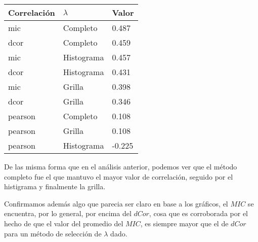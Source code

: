     \begin{table}[H]
        \centering
        \begin{tabular}{|l|l|l|}\hline
         Correlaci\'on    & $\lambda$ & Valor  \\    \hline
        mic     & Completo    & 0.487  \\
        dcor    & Completo    & 0.459  \\
        mic     & Histograma  & 0.457  \\
        dcor    & Histograma  & 0.431  \\
        mic     & Grilla      & 0.398  \\
        dcor    & Grilla      & 0.346 \\
        pearson & Completo    & 0.108  \\
        pearson & Grilla      & 0.108  \\
        pearson & Histograma  & -0.225 \\\hline
        \end{tabular}
    \end{table}
    
    De las misma forma que en el an\'alisis anterior, podemos ver que el m\'etodo completo fue el que mantuvo el mayor valor de correlaci\'on, seguido por el histigrama y finalmente la grilla. 
    
    Confirmamos adem\'as algo que parecia ser claro en base a los gr\'aficos, el $MIC$ se encuentra, por lo general, por encima del $dCor$, cosa que es corroborada por el hecho de que el valor del promedio del $MIC$, es siempre mayor que el de $dCor$ para un m\'etodo de selecci\'on de $\lambda$ dado.